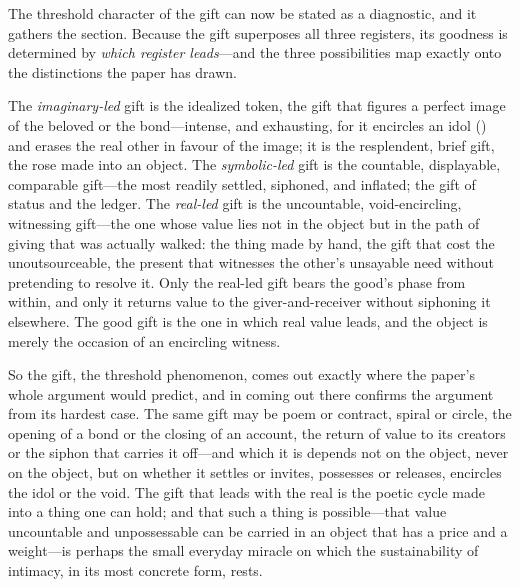 The threshold character of the gift can now be stated as a diagnostic, and it gathers the section. Because the gift superposes all three registers, its goodness is determined by \emph{which register leads}---and the three possibilities map exactly onto the distinctions the paper has drawn.

\begin{claim}
The \emph{imaginary-led} gift is the idealized token, the gift that figures a perfect image of the beloved or the bond---intense, and exhausting, for it encircles an idol () and erases the real other in favour of the image; it is the resplendent, brief gift, the rose made into an object. The \emph{symbolic-led} gift is the countable, displayable, comparable gift---the most readily settled, siphoned, and inflated; the gift of status and the ledger. The \emph{real-led} gift is the uncountable, void-encircling, witnessing gift---the one whose value lies not in the object but in the path of giving that was actually walked: the thing made by hand, the gift that cost the unoutsourceable, the present that witnesses the other's unsayable need without pretending to resolve it. Only the real-led gift bears the good's phase from within, and only it returns value to the giver-and-receiver without siphoning it elsewhere. The good gift is the one in which real value leads, and the object is merely the occasion of an encircling witness.
\end{claim}

So the gift, the threshold phenomenon, comes out exactly where the paper's whole argument would predict, and in coming out there confirms the argument from its hardest case. The same gift may be poem or contract, spiral or circle, the opening of a bond or the closing of an account, the return of value to its creators or the siphon that carries it off---and which it is depends not on the object, never on the object, but on whether it settles or invites, possesses or releases, encircles the idol or the void. The gift that leads with the real is the poetic cycle made into a thing one can hold; and that such a thing is possible---that value uncountable and unpossessable can be carried in an object that has a price and a weight---is perhaps the small everyday miracle on which the sustainability of intimacy, in its most concrete form, rests.
